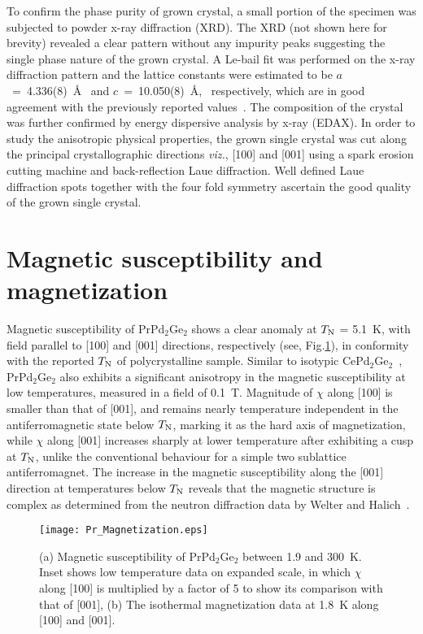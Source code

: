 \documentclass[preprint,showpacs,preprintnumbers,amsmath,amssymb, prb]{revtex4}
\begin{document}
To confirm the phase purity of grown crystal, a small portion of the specimen was subjected to powder x-ray diffraction (XRD).  The XRD (not shown here for brevity)  revealed  a clear pattern without any impurity peaks suggesting the single phase nature of the grown crystal.  A Le-bail fit was performed on the x-ray diffraction pattern and the lattice constants were estimated to be $a$~=~4.336(8)~\AA~ and $c$~=~10.050(8)~\AA,~ respectively, which are in good agreement with the previously reported values~\cite{Rossi,Welter}. The composition of the crystal was further confirmed by energy dispersive analysis by x-ray (EDAX). In order to study the anisotropic physical properties, the grown single crystal was cut along the principal crystallographic directions \textit{viz.}, [100] and [001] using a spark erosion cutting machine and back-reflection Laue diffraction.  Well defined Laue diffraction spots together with the four fold symmetry ascertain the good quality of the grown single crystal.
%

\section{Magnetic susceptibility and magnetization}
Magnetic susceptibility of PrPd$_2$Ge$_2$ shows a clear anomaly at $T_{\rm N}$ = 5.1~K,  with field parallel to [100] and [001] directions, respectively (see, Fig.\ref{Pr_Magnetization}), in conformity with the reported $T_{\rm N}$ of polycrystalline sample. Similar to isotypic CePd$_2$Ge$_2$~\cite{Arvind CePd2Ge2}, PrPd$_2$Ge$_2$ also exhibits a significant anisotropy in the magnetic susceptibility at low temperatures, measured in a field of 0.1~T. Magnitude of $\chi$ along [100] is smaller than that of [001], and remains nearly temperature independent in the antiferromagnetic state below $T_{\rm N}$, marking it as the hard axis of magnetization, while $\chi$ along [001] increases sharply at lower temperature after exhibiting a cusp at $T_{\rm N}$, unlike the conventional behaviour for a simple two sublattice antiferromagnet.  The increase in the magnetic susceptibility along the [001] direction at temperatures below   $T_{\rm N}$ reveals that the magnetic structure is complex as determined from the neutron diffraction data  by Welter and Halich~\cite{Welter}. 
\begin{figure}[!]
\centering
\texttt{[image: Pr\_Magnetization.eps]}
\caption{\label{Pr_Magnetization}  (a) Magnetic susceptibility of PrPd$_2$Ge$_2$ between 1.9 and  300~K. Inset shows low temperature data on expanded scale, in which $\chi$ along [100] is multiplied by a factor of 5 to show its comparison with that of [001], (b) The isothermal magnetization data at 1.8~K along [100] and [001].}
\end{figure}
%
\end{document}
